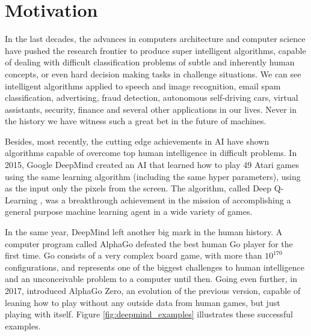 \section{Motivation}


In the last decades, the advances in computers architecture and computer science have pushed the research frontier to produce super intelligent algorithms, capable of dealing with difficult classification problems of subtle and inherently human concepts, or even hard decision making tasks in challenge situations. We can see intelligent algorithms applied to speech and image recognition, email spam classification, advertising, fraud detection, autonomous self-driving cars, virtual assistants, security, finance and several other applications in our lives. Never in the history we have witness such a great bet in the future of machines.


Besides, most recently, the cutting edge achievements in AI have shown algorithms capable of overcome top human intelligence in difficult problems. In 2015, Google DeepMind created an AI that learned how to play 49 Atari games using the same learning algorithm (including the same hyper parameters), using as the input only the pixels from the screen. The algorithm, called Deep Q-Learning \cite{RLNature2015}, was a breakthrough achievement in the mission of accomplishing a general purpose machine learning agent in a wide variety of games.

In the same year, DeepMind left another big mark in the human history. A computer program called AlphaGo defeated the best human Go player for the first time. Go consists of a very complex board game, with more than $10^170$ configurations, and represents one of the biggest challenges to human intelligence and an unconceivable problem to a computer until then. Going even further, in 2017,  introduced AlphaGo Zero, an evolution of the previous version, capable of leaning how to play without any outside data from human games, but just playing with itself. Figure \ref{fig:deepmind_examples} illustrates these successful examples.

